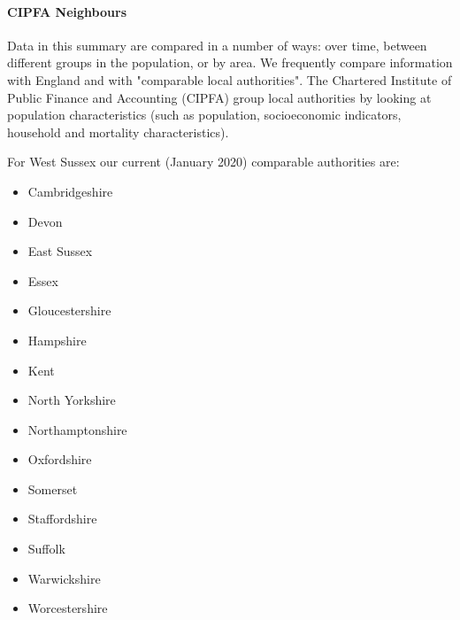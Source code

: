 \paragraph{CIPFA Neighbours}
Data in this summary are compared in a number of ways: over time, between different groups in the population, or by area. We frequently compare information with England and with "comparable local authorities". The Chartered Institute of Public Finance and Accounting (CIPFA) group local authorities by looking at population characteristics (such as population, socioeconomic indicators, household and mortality characteristics).

For West Sussex our current (January 2020) comparable authorities are:
\begin{multicols}{3}
\begin{itemize}
    \item Cambridgeshire
    \item Devon
    \item East Sussex
    \item Essex
    \item Gloucestershire
    \item Hampshire
    \item Kent
    \item North Yorkshire
    \item Northamptonshire
    \item Oxfordshire
    \item Somerset
    \item Staffordshire
    \item Suffolk
    \item Warwickshire
    \item Worcestershire
\end{itemize}
\end{multicols}


